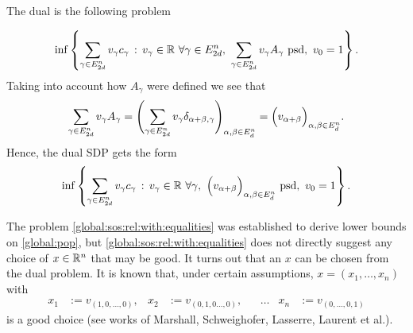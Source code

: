 The dual is the following problem

\[
	\inf \setcond{ \sum_{\gamma \in E^n_{2d} } v_\gamma c_\gamma }{v_\gamma \in \R \ \forall \gamma \in E^n_{2d}, \ \sum_{\gamma \in E^n_{2d}} v_\gamma A_\gamma \ \text{psd}, \ v_0 = 1}.
\]
%
Taking into account how $A_\gamma$ were defined we see that 
\[
	\sum_{\gamma \in E^n_{2d}} v_\gamma A_\gamma = \Biggl( \sum_{\gamma \in E^n_{2d}} v_\gamma \delta_{\alpha + \beta,\gamma} \Biggr)_{\alpha, \beta \in E^n_d} = \Bigl( v_{\alpha+ \beta} \Bigr)_{\alpha, \beta \in E^n_d}.
\]
%
Hence, the dual SDP gets the form
\begin{equation}
	\label{global:sos:rel:with:equalities:simplified}
	\inf \setcond{ \sum_{\gamma \in E^n_{2d}} v_\gamma c_\gamma }{v_\gamma \in \R \ \forall \gamma, \ \Big(v_{\alpha+\beta}\Big)_{\alpha, \beta \in E^n_d} \ \text{psd}, \ v_0 = 1}.
\end{equation}
%
%
\begin{remark}
The problem \eqref{global:sos:rel:with:equalities} was established to derive lower bounds on \eqref{global:pop}, but \eqref{global:sos:rel:with:equalities} does not directly suggest any choice of $x \in \mathbb{R}^n$ that may be good. It turns out that an $x$ can be chosen from the dual problem. It is known that, under certain assumptions, $x=(x_1,\ldots,x_n)$ with 
\begin{align*}
 x_1 & := v_{(1,0,\ldots,0)}, & x_2 & := v_{(0,1,0\ldots,0)}, & & \ldots & x_n & := v_{(0,\ldots,0,1)}
\end{align*}
is a good choice (see works of Marshall, Schweighofer, Lasserre, Laurent et al.). 
\end{remark}
%

